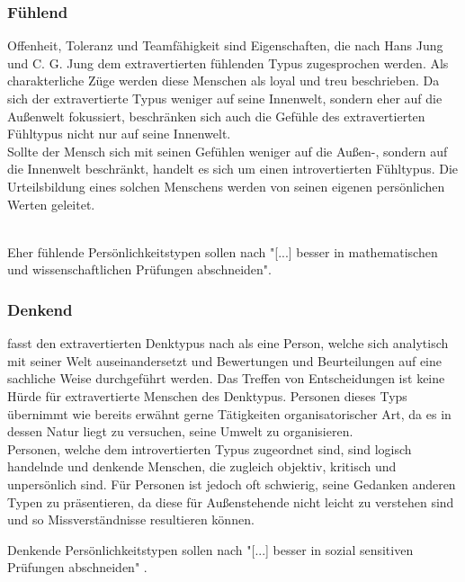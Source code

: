 \subsubsection{Fühlend}
Offenheit, Toleranz und Teamfähigkeit sind Eigenschaften, die nach Hans Jung und C. G. Jung dem extravertierten fühlenden Typus zugesprochen werden. Als charakterliche Züge werden diese Menschen als loyal und treu beschrieben. Da sich der extravertierte Typus weniger auf seine Innenwelt, sondern eher auf die Außenwelt fokussiert, beschränken sich auch die Gefühle des extravertierten Fühltypus nicht nur auf seine Innenwelt.\\
Sollte der Mensch sich mit seinen Gefühlen weniger auf die Außen-, sondern auf die Innenwelt beschränkt, handelt es sich um einen introvertierten Fühltypus. Die Urteilsbildung eines solchen Menschens werden von seinen eigenen persönlichen Werten geleitet.

\noindent
\cite{jung_2014} \\
\noindent
Eher fühlende Persönlichkeitstypen sollen nach \citeauthor{mccaulley_myers-briggs_1974} "[...] besser in mathematischen und wissenschaftlichen Prüfungen abschneiden"\cite{mccaulley_myers-briggs_1974}. 

\subsubsection{Denkend}
\citeauthor{jung_2014} fasst den extravertierten Denktypus nach \citeauthor{jung_1921} als eine Person, welche sich analytisch mit seiner Welt auseinandersetzt und Bewertungen und Beurteilungen auf eine sachliche Weise durchgeführt werden. Das Treffen von Entscheidungen ist keine Hürde für extravertierte Menschen des Denktypus. Personen dieses Typs übernimmt wie bereits erwähnt gerne Tätigkeiten organisatorischer Art, da es in dessen Natur liegt zu versuchen, seine Umwelt zu organisieren.\\
Personen, welche dem introvertierten Typus zugeordnet sind, sind logisch handelnde und denkende Menschen, die zugleich objektiv, kritisch und unpersönlich sind. Für Personen ist jedoch oft schwierig, seine Gedanken anderen Typen zu präsentieren, da diese für Außenstehende nicht leicht zu verstehen sind und so Missverständnisse resultieren können.


\noindent
\cite{jung_2014}

Denkende Persönlichkeitstypen sollen nach \citeauthor{mccaulley_myers-briggs_1974} "[...] besser in sozial sensitiven Prüfungen abschneiden" \cite{mccaulley_myers-briggs_1974}.

